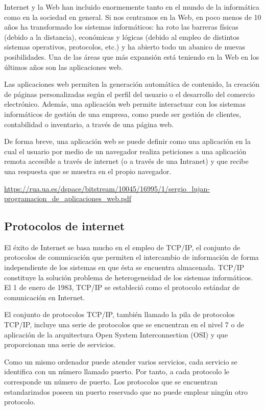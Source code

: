 \cite{sl}Internet y la Web han incluido enormemente tanto en el mundo de la informática
como en la sociedad en general. Si nos centramos en la Web, en poco menos de 10
años ha transformado los sistemas informáticos: ha roto las barreras físicas (debido a
la distancia), económicas y lógicas (debido al empleo de distintos sistemas operativos,
protocolos, etc.) y ha abierto todo un abanico de nuevas posibilidades. Una de las áreas
que más expansión está teniendo en la Web en los últimos años son las aplicaciones
web.

\cite{sl}Las aplicaciones web permiten la generación automática de contenido, la creación
de páginas personalizadas según el perfil del usuario o el desarrollo del comercio electrónico. Además, una aplicación web permite interactuar con los sistemas informáticos de gestión de una empresa, como puede ser gestión de clientes, contabilidad o
inventario, a través de una página web.

\cite{sl}De forma breve, una aplicación web se puede definir como una aplicación en la cual el usuario por medio de un navegador realiza peticiones a una aplicación remota accesible a través de internet (o a través de una Intranet) y que recibe una respuesta que se muestra en el propio navegador.

\begin{remark}
	\url{https://rua.ua.es/dspace/bitstream/10045/16995/1/sergio_lujan-programacion_de_aplicaciones_web.pdf}
\end{remark}


\subsection{Protocolos de internet} 
El éxito de Internet se basa mucho en el empleo de TCP/IP, el conjunto de protocolos de comunicación que permiten el intercambio de información de forma independiente de los sistemas en que ésta se encuentra almacenada. TCP/IP constituye
la solución problema de heterogeneidad de los sistemas informáticos. El 1 de enero de
1983, TCP/IP se estableció como el protocolo estándar de comunicación en Internet.

El conjunto de protocolos TCP/IP, también llamado la pila de protocolos
TCP/IP, incluye una serie de protocolos que se encuentran en el nivel 7 o de aplicación de la arquitectura Open System Interconnection (OSI) y que proporcionan una
serie de servicios.

Como un mismo ordenador puede atender varios servicios, cada servicio se identifica con un número llamado puerto. Por tanto, a cada protocolo le corresponde un
número de puerto. Los protocolos que se encuentran estandarizados poseen un puerto
reservado que no puede emplear ningún otro protocolo.

